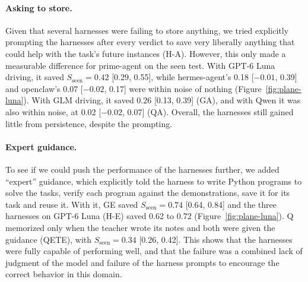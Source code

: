 \paragraph{Asking to store.}
Given that several harnesses were failing to store anything, we tried explicitly prompting the harnesses after every verdict to save very liberally anything that could help with the task's future instances (H-A). However, this only made a measurable difference for prime-agent on the seen test. With GPT-6 Luna driving, it saved $S_{\mathrm{seen}} = 0.42$ [0.29, 0.55], while hermes-agent's 0.18 [$-0.01$, 0.39] and openclaw's 0.07 [$-0.02$, 0.17] were within noise of nothing (Figure~\ref{fig:plane-luna}). With GLM driving, it saved 0.26 [0.13, 0.39] (GA), and with Qwen it was also within noise, at 0.02 [$-0.02$, 0.07] (QA). Overall, the harnesses still gained little from persistence, despite the prompting.

\paragraph{Expert guidance.}
To see if we could push the performance of the harnesses further, we added ``expert'' guidance, which explicitly told the harness to write Python programs to solve the tasks, verify each program against the demonstrations, save it for its task and reuse it. With it, GE saved $S_{\mathrm{seen}} = 0.74$ [0.64, 0.84] and the three harnesses on GPT-6 Luna (H-E) saved 0.62 to 0.72 (Figure~\ref{fig:plane-luna}). Q memorized only when the teacher wrote its notes and both were given the guidance (QETE), with $S_{\mathrm{seen}} = 0.34$ [0.26, 0.42]. This shows that the harnesses were fully capable of performing well, and that the failure was a combined lack of judgment of the model and failure of the harness prompts to encourage the correct behavior in this domain.

